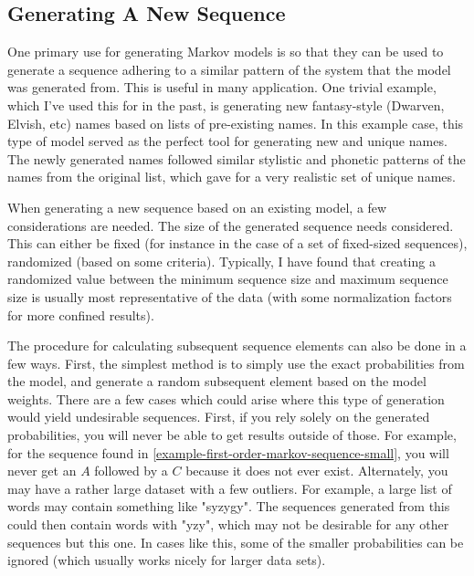 \unfinished




















\subsection{Generating A New Sequence}

One primary use for generating Markov models is so that they can be used to generate a sequence adhering to a similar pattern of the system that the model was generated from. This is useful in many application. One trivial example, which I've used this for in the past, is generating new fantasy-style (Dwarven, Elvish, etc) names based on lists of pre-existing names. In this example case, this type of model served as the perfect tool for generating new and unique names. The newly generated names followed similar stylistic and phonetic patterns of the names from the original list, which gave for a very realistic set of unique names.

When generating a new sequence based on an existing model, a few considerations are needed. The size of the generated sequence needs considered. This can either be fixed (for instance in the case of a set of fixed-sized sequences), randomized (based on some criteria). Typically, I have found that creating a randomized value between the minimum sequence size and maximum sequence size is usually most representative of the data (with some normalization factors for more confined results). 

The procedure for calculating subsequent sequence elements can also be done in a few ways. First, the simplest method is to simply use the exact probabilities from the model, and generate a random subsequent element based on the model weights. There are a few cases which could arise where this type of generation would yield undesirable sequences. First, if you rely solely on the generated probabilities, you will never be able to get results outside of those. For example, for the sequence found in \ref{example-first-order-markov-sequence-small}, you will never get an $A$ followed by a $C$ because it does not ever exist. Alternately, you may have a rather large dataset with a few outliers. For example, a large list of words may contain something like "syzygy". The sequences generated from this could then contain words with "yzy", which may not be desirable for any other sequences but this one. In cases like this, some of the smaller probabilities can be ignored (which usually works nicely for larger data sets).

